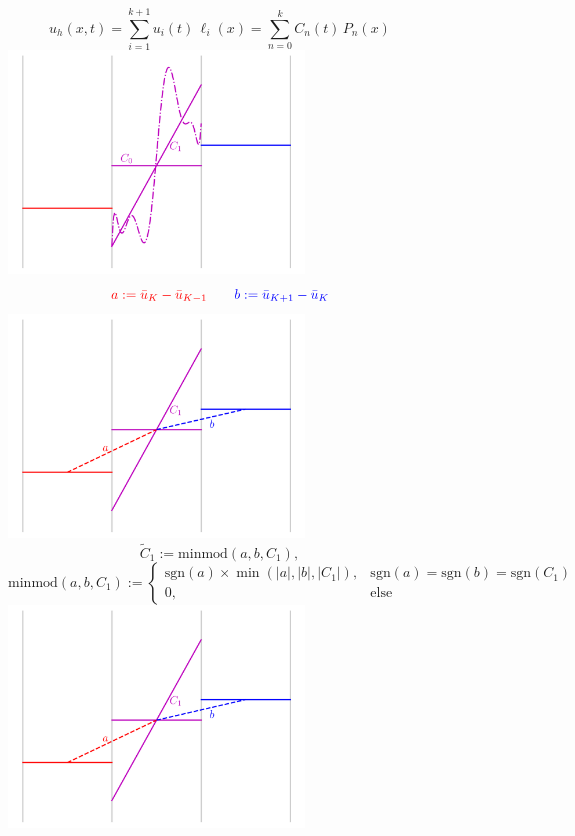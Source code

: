 \documentclass{beamer}
\begin{document}
\begin{frame}
\begin{figure}
\begin{overprint}
        $$u_{h}\left(x,t\right)
        = \sum\limits_{i=1}^{k+1} u_{i}\left(t\right) \, \ell_{i}\left(x\right)
        = \sum\limits_{n=0}^{k} C_{n}\left(t\right) \, P_{n}\left(x\right)$$
        \centering\includegraphics[width=0.7\textwidth]{./fig.sl_04.png}
        $$\textcolor{red}{a:=\bar{u}_{K}-\bar{u}_{K-1}}\hspace{2em}
          \textcolor{blue}{b:=\bar{u}_{K+1}-\bar{u}_{K}}$$
        \centering\includegraphics[width=0.7\textwidth]{./fig.sl_05.png}
        \Fontvi
        $$\tilde{C}_{1} := \mathrm{minmod}\left(a,b,C_{1}\right),$$
        $$\mathrm{minmod}\left(a,b,C_{1}\right)
        := \begin{cases}
             \mathrm{sgn}\left(a\right)\times
             \min\left(\left|a\right|,\left|b\right|,\left|C_{1}\right|\right),
             & \mathrm{sgn}\left(a\right)=\mathrm{sgn}\left(b\right)
               =\mathrm{sgn}\left(C_{1}\right) \\
             0, & \mathrm{else}
           \end{cases}$$
        \centering\includegraphics[width=0.7\textwidth]{./fig.sl_05.png}

\end{overprint}
\end{figure}
\end{frame}
\end{document}
